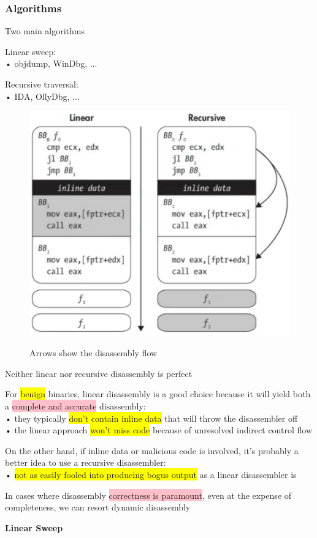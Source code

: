 \documentclass[]{project_plan}
\begin{document}
\subsubsection{Algorithms}

Two main algorithms

Linear sweep:\\
• objdump, WinDbg, ...

Recursive traversal:\\
• IDA, OllyDbg, ...

\begin{figure}[H]
  \centering
  \includegraphics[width=.6\linewidth]{dissassembly algos.png}

  Arrows show the disassembly flow
\end{figure}

Neither linear nor recursive disassembly is perfect

For \colorbox{yellow}{benign} binaries, linear disassembly is a good choice because it will yield both a
\colorbox{pink}{complete and accurate} disassembly:\\
• they typically \colorbox{yellow}{don’t contain inline data} that will throw the disassembler off\\
• the linear approach \colorbox{yellow}{won’t miss code} because of unresolved indirect control flow

On the other hand, if inline data or malicious code is involved, it’s probably a better
idea to use a recursive disassembler:\\
• \colorbox{yellow}{not as easily fooled into producing bogus output} as a linear disassembler is

In cases where disassembly \colorbox{pink}{correctness is paramount}, even at the expense of
completeness, we can resort dynamic disassembly

\textbf{Linear Sweep}
\end{document}
